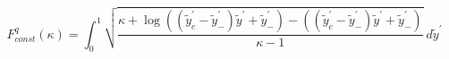 \begin{equation}
F^q_{const}(\kappa)=\int^{1}_{0}\sqrt{\frac{\kappa+\log((\tilde{y}_c^\prime-\tilde{y}_-^\prime)\tilde{y}^\prime+\tilde{y}_-^\prime)-((\tilde{y}_c^\prime-\tilde{y}_-^\prime)\tilde{y}^\prime+\tilde{y}_-^\prime)}{\kappa-1}}~d\tilde{y}^\prime
\end{equation}

